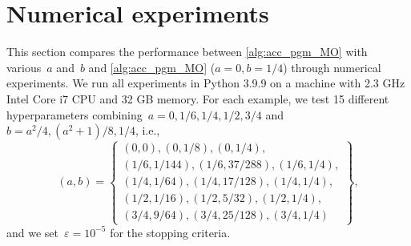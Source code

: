 \documentclass[../main]{subfiles}
\begin{document}
\section{Numerical experiments} \label{sec:acc_pgm:experiments}
This section compares the performance between \cref{alg:acc_pgm_MO} with various~$a$ and~$b$ and \cref{alg:acc_pgm_MO} ($a = 0, b = 1 / 4$) through numerical experiments.
We run all experiments in Python 3.9.9 on a machine with 2.3 GHz Intel Core i7 CPU and 32 GB memory.
For each example, we test 15 different hyperparameters combining~$a = 0, 1 / 6, 1 / 4, 1 / 2, 3 / 4$ and~$b = a^2 / 4, (a^2 + 1) / 8, 1 / 4$, i.e.,
\[
    (a, b) = \left\{
        \begin{gathered}
            (0, 0), (0, 1 / 8), (0, 1 / 4),\\
            (1 / 6, 1 / 144), (1 / 6, 37 / 288), (1 / 6, 1 / 4),\\
            (1 / 4, 1 / 64), (1 / 4, 17 / 128), (1 / 4, 1 / 4), \\
            (1 / 2, 1 / 16), (1 / 2, 5 / 32), (1 / 2, 1 / 4), \\
            (3 / 4, 9 / 64), (3 / 4, 25 / 128), (3 / 4, 1 / 4)
        \end{gathered}
    \right\},
\] 
and we set~$\varepsilon = 10^{-5}$ for the stopping criteria.
\end{document}

